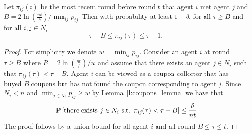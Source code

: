 \begin{lemma}\label{l:coupons}
Let $\pi_{ij}(t)$ be the most recent round before round $t$ that agent $i$ met agent $j$
and $B=2\ln(\frac{nt}{\delta})/\min_{ij}p_{ij}$.
Then with probability at least $1-\delta$, for all $\tau \geq B$ and for all
$i, j \in N_i$\[\tau-B\leq \pi_{ij}(\tau)\leq \tau-1.\]
\end{lemma}
\begin{proof}
For simplicity we denote $w=\min_{ij}p_{ij}$.
Consider an agent $i$ at round $\tau \geq B$ where $B=2\ln(\frac{nt}{\delta})/w$
and assume that there exists an agent $j\in N_i$ such that $\pi_{ij}(\tau)< {\tau-B}$.
Agent $i$ can be viewed as a coupon collector that has buyed $B$ coupons
but has not found the coupon corresponding to agent $j$. Since $N_i<n$ and
$\min_{j \in N_i}p_{ij}\geq w$ by Lemma~\ref{l:coupons_lemma} we have that
\[\bm{\mathrm{P}}\left[\text{there exists }j\in N_i \text{ s.t. }\pi_{ij}(\tau)< {\tau-B}\right]\leq \frac{\delta}{nt}\]
The proof follows by a union bound for all agent $i$ and all round $B\leq \tau \leq t$.


\end{proof}
%
